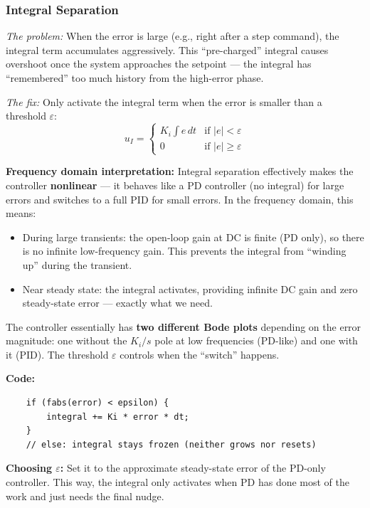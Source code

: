 \subsubsection{Integral Separation}

\textit{The problem:} When the error is large (e.g., right after a step command), the integral term accumulates aggressively. This ``pre-charged'' integral causes overshoot once the system approaches the setpoint --- the integral has ``remembered'' too much history from the high-error phase.

\textit{The fix:} Only activate the integral term when the error is smaller than a threshold $\varepsilon$:
\begin{equation}
u_I = \begin{cases} K_i \int e \, dt & \text{if } |e| < \varepsilon \\ 0 & \text{if } |e| \geq \varepsilon \end{cases}
\end{equation}

\textbf{Frequency domain interpretation:} Integral separation effectively makes the controller \textbf{nonlinear} --- it behaves like a PD controller (no integral) for large errors and switches to a full PID for small errors. In the frequency domain, this means:
\begin{itemize}
    \item During large transients: the open-loop gain at DC is finite (PD only), so there is no infinite low-frequency gain. This prevents the integral from ``winding up'' during the transient.
    \item Near steady state: the integral activates, providing infinite DC gain and zero steady-state error --- exactly what we need.
\end{itemize}

The controller essentially has \textbf{two different Bode plots} depending on the error magnitude: one without the $K_i/s$ pole at low frequencies (PD-like) and one with it (PID). The threshold $\varepsilon$ controls when the ``switch'' happens.

\textbf{Code:}
\begin{verbatim}
    if (fabs(error) < epsilon) {
        integral += Ki * error * dt;
    }
    // else: integral stays frozen (neither grows nor resets)
\end{verbatim}

\textbf{Choosing $\varepsilon$:} Set it to the approximate steady-state error of the PD-only controller. This way, the integral only activates when PD has done most of the work and just needs the final nudge.

